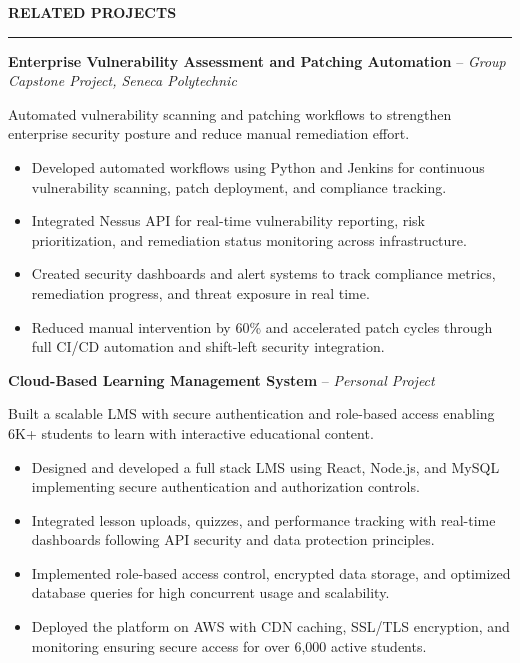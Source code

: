 \documentclass[10pt,letterpaper]{article}
\begin{document}
\vspace{6pt}

\textbf{RELATED PROJECTS}\\[-8pt]
\noindent\rule{\textwidth}{1pt}

\vspace{-2pt}

\textbf{Enterprise Vulnerability Assessment and Patching Automation} -- \emph{Group Capstone Project, Seneca Polytechnic}

\vspace{-1pt}

Automated vulnerability scanning and patching workflows to strengthen enterprise security posture and reduce manual remediation effort.
\vspace{-1pt}
\begin{itemize}
\item Developed automated workflows using Python and Jenkins for continuous vulnerability scanning, patch deployment, and compliance tracking.
\item Integrated Nessus API for real-time vulnerability reporting, risk prioritization, and remediation status monitoring across infrastructure.
\item Created security dashboards and alert systems to track compliance metrics, remediation progress, and threat exposure in real time.
\item Reduced manual intervention by 60\% and accelerated patch cycles through full CI/CD automation and shift-left security integration.
\end{itemize}

\textbf{Cloud-Based Learning Management System} -- \emph{Personal Project}

\vspace{-1pt}

Built a scalable LMS with secure authentication and role-based access enabling 6K+ students to learn with interactive educational content.
\vspace{-1pt}
\begin{itemize}
\item Designed and developed a full stack LMS using React, Node.js, and MySQL implementing secure authentication and authorization controls.
\item Integrated lesson uploads, quizzes, and performance tracking with real-time dashboards following API security and data protection principles.
\item Implemented role-based access control, encrypted data storage, and optimized database queries for high concurrent usage and scalability.
\item Deployed the platform on AWS with CDN caching, SSL/TLS encryption, and monitoring ensuring secure access for over 6,000 active students.
\end{itemize}
\end{document}
